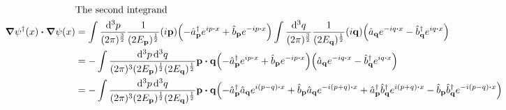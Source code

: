 \documentclass{article}
\begin{document}
\begin{align*}
                                        & \qq*{The second integrand}                                                                                                                                                                                                                                                                                                                                         \\
  \grad\psi^\dagger(x)\vdot\grad\psi(x) & =\int \frac{\dd[3]{p}}{(2\pi)^\frac{3}{2}}  \frac{1}{(2E_{\vb{p}})^{\frac{1}{2}}} (i\vb{p}) \pqty{-\hat{a}^\dagger_{\vb{p}}e^{ip\vdot x}+\hat{b}_{\vb{p}}e^{-ip\vdot x}}\int \frac{\dd[3]{q}}{(2\pi)^\frac{3}{2}}  \frac{1}{(2E_{\vb{q}})^{\frac{1}{2}}} (i\vb{q}) \pqty{\hat{a}_{\vb{q}}e^{-iq\vdot x}-\hat{b}^\dagger_{\vb{q}}e^{iq\vdot x}}                     \\
                                        & =-\int \frac{\dd[3]{p}\dd[3]{q}}{(2\pi)^3(2E_{\vb{p}})^{\frac{1}{2}}(2E_{\vb{q}})^{\frac{1}{2}}}\vb{p}\vdot\vb{q}\pqty{-\hat{a}^\dagger_{\vb{p}}e^{ip\vdot x}+\hat{b}_{\vb{p}}e^{-ip\vdot x}}\pqty{\hat{a}_{\vb{q}}e^{-iq\vdot x}-\hat{b}^\dagger_{\vb{q}}e^{iq\vdot x}}                                                                                           \\
                                        & =-\int \frac{\dd[3]{p}\dd[3]{q}}{(2\pi)^3(2E_{\vb{p}})^{\frac{1}{2}}(2E_{\vb{q}})^{\frac{1}{2}}}\vb{p}\vdot\vb{q}\pqty{-\hat{a}^\dagger_{\vb{p}}\hat{a}_{\vb{q}}e^{i(p-q)\vdot x}+\hat{b}_{\vb{p}}\hat{a}_{\vb{q}}e^{-i(p+q)\vdot x}+\hat{a}^\dagger_{\vb{p}}\hat{b}^\dagger_{\vb{q}}e^{i(p+q)\vdot x}-\hat{b}_{\vb{p}}\hat{b}^\dagger_{\vb{q}}e^{-i(p-q)\vdot x}}
\end{align*}
\end{document}
